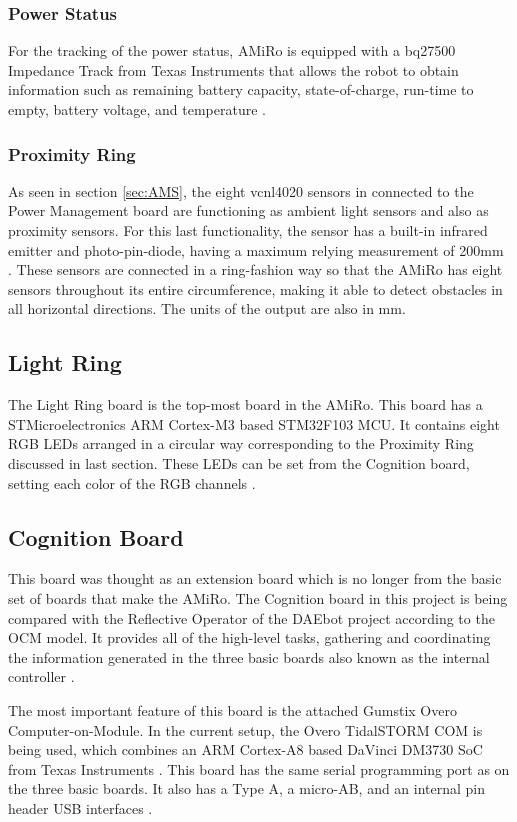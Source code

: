 \documentclass[12pt]{report}%
\begin{document}
\subsubsection{Power Status}
For the tracking of the power status, AMiRo is equipped with a bq27500 Impedance Track from Texas Instruments that allows the robot to obtain information such as remaining battery capacity, state-of-charge, run-time to empty, battery voltage, and temperature \cite{impedancepart}.

\subsubsection{Proximity Ring}
As seen in section \ref{sec:AMS}, the eight vcnl4020 sensors in connected to the Power Management board are functioning as ambient light sensors and also as proximity sensors. For this last functionality, the sensor has a built-in infrared emitter and photo-pin-diode, having a maximum relying measurement of 200mm \cite{proxsensor}. These sensors are connected in a ring-fashion way so that the AMiRo has eight sensors throughout its entire circumference, making it able to detect obstacles in all horizontal directions. The units of the output are also in mm.

\subsection{Light Ring}
The Light Ring board is the top-most board in the AMiRo. This board has a STMicroelectronics ARM Cortex-M3 based STM32F103 MCU. It contains eight RGB LEDs arranged in a circular way corresponding to the Proximity Ring discussed in last section. These LEDs can be set from the Cognition board, setting each color of the RGB channels \cite{AMiRo_paper_modular}.

\subsection{Cognition Board}
\label{sub:cogn}
This board was thought as an extension board which is no longer from the basic set of boards that make the AMiRo. The Cognition board in this project is being compared with the Reflective Operator of the DAEbot project according to the OCM model. It provides all of the high-level tasks, gathering and coordinating the information generated in the three basic boards also known as the internal controller \cite{AMiRo_paper_modular}.

The most important feature of this board is the attached Gumstix Overo Computer-on-Module. In the current setup, the Overo TidalSTORM COM is being used, which combines an ARM Cortex-A8 based DaVinci DM3730 SoC from Texas Instruments \cite{AMiRo_paper_modular}. This board has the same serial programming port as on the three basic boards. It also has a Type A, a micro-AB, and an internal pin header USB interfaces \cite{AMiRo_paper_modular}.
\end{document}
